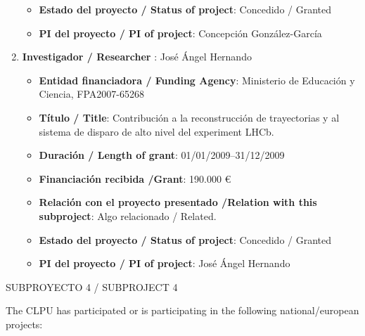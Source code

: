 \begin{enumerate}
\begin{itemize}
\item {\bf Estado del proyecto / Status of project}: Concedido / Granted
\item {\bf PI del proyecto / PI of project}: Concepción González-García 
\end{itemize}
\item {\bf Investigador / Researcher }: José Ángel Hernando
\begin{itemize}
\item {\bf Entidad financiadora / Funding Agency}: Ministerio de Educaci\'on y Ciencia, FPA2007-65268
\item {\bf Título / Title}:  Contribuci\'on a la reconstrucci\'on de trayectorias y al sistema de disparo de alto nivel del experiment LHCb.
\item {\bf Duración / Length of grant}: 01/01/2009--31/12/2009
\item {\bf Financiación recibida /Grant}: 190.000 \euro 
\item {\bf Relación con el proyecto presentado /Relation with this subproject}: Algo relacionado / Related. 
\item {\bf Estado del proyecto / Status of project}: Concedido / Granted
\item {\bf PI del proyecto / PI of project}: José Ángel Hernando
\end{itemize}
\end{enumerate}


{\sc SUBPROYECTO 4 / SUBPROJECT 4}

The CLPU has participated or is participating in the following national/european projects: 

